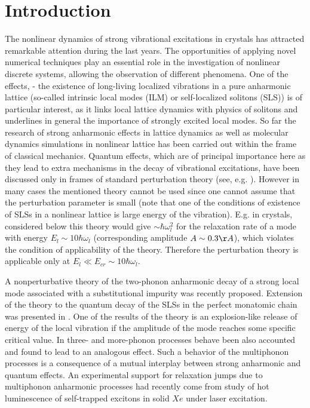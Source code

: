 \section{Introduction}
The nonlinear dynamics of strong vibrational excitations in crystals has 
attracted remarkable attention during the last years. The opportunities of 
applying novel numerical techniques play an essential role in the 
investigation of nonlinear discrete systems, allowing the observation of
different  phenomena. One of the effects, - the existence of long-living
localized vibrations in a pure anharmonic lattice (so-called intrinsic local
modes (ILM) or self-localized solitons (SLS)) \cite{dolgov,sivtak} is of 
particular interest, as it links local lattice dynamics with physics of 
solitons and underlines in general the importance of strongly excited local 
modes. So far the research of strong anharmonic effects in lattice dynamics 
as well as molecular dynamics simulations in nonlinear lattice has been 
carried out within the frame of classical mechanics. Quantum effects, which 
are of principal importance here as they lead to extra mechanisms in the decay
of vibrational excitations,
have been discussed only in frames of standard perturbation theory (see, e.g.
\cite{ovchi}). However in many cases the mentioned theory
cannot be used since one cannot assume that the perturbation parameter is 
small (note that one of the conditions of existence of SLSs in a nonlinear 
lattice is large energy of the vibration). E.g. in crystals, considered
below this theory would give  $\sim \hbar \omega_l^2$ for the relaxation rate 
of a mode with energy $E_l \sim 10 \hbar \omega_l$ (corresponding amplitude 
$A\sim 0.3 \AA$), which violates the condition of applicability of the theory.
Therefore the perturbation theory is applicable only at $E_l\ll E_{cr}\sim
10\hbar\omega_l$. 

A nonperturbative theory of the two-phonon anharmonic decay of a strong local 
mode \cite{hizhrev} associated with a substitutional impurity was recently 
proposed. Extension of the theory to the quantum decay of the
SLSs in the perfect monatomic chain was presented in \cite{chain}. One of 
the results of the theory is an explosion-like release of energy of the local 
vibration if the amplitude of the mode reaches some specific critical value. 
In \cite{multi} three- and more-phonon processes behave been also 
accounted and found to lead to an analogous effect. Such a behavior of the 
multiphonon processes is a consequence of a mutual interplay between strong 
anharmonic and quantum effects. An experimental support for relaxation jumps 
due to multiphonon anharmonic processes had recently come from study of hot 
luminescence of self-trapped excitons in solid $Xe$ under laser
excitation.  

